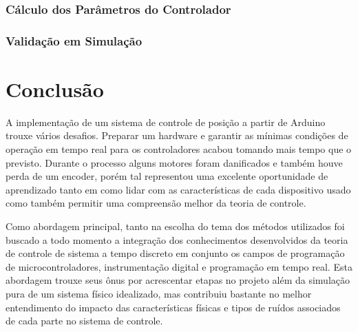 \documentclass[a4paper,11pt]{article}
\begin{document}
\subsubsection{Cálculo dos Parâmetros do Controlador}


\subsubsection{Validação em Simulação}


\section{Conclusão}

A implementação de um sistema de controle de posição a partir de Arduino trouxe vários desafios. Preparar um hardware e garantir as mínimas condições de operação em tempo real para os controladores acabou tomando mais tempo que o previsto. Durante o processo alguns motores foram danificados e também houve perda de um encoder, porém tal representou uma excelente oportunidade de aprendizado tanto em como lidar com as características de cada dispositivo usado como também permitir uma compreensão melhor da teoria de controle.

Como abordagem principal, tanto na escolha do tema dos métodos utilizados foi buscado a todo momento a integração dos conhecimentos desenvolvidos da teoria de controle de sistema a tempo discreto em conjunto os campos de programação de microcontroladores, instrumentação digital e programação em tempo real. Esta abordagem trouxe seus ônus por acrescentar etapas no projeto além da simulação pura de um sistema físico idealizado, mas contribuiu bastante no melhor entendimento do impacto das características físicas e tipos de ruídos associados de cada parte no sistema de controle.


\newpage
\end{document}
